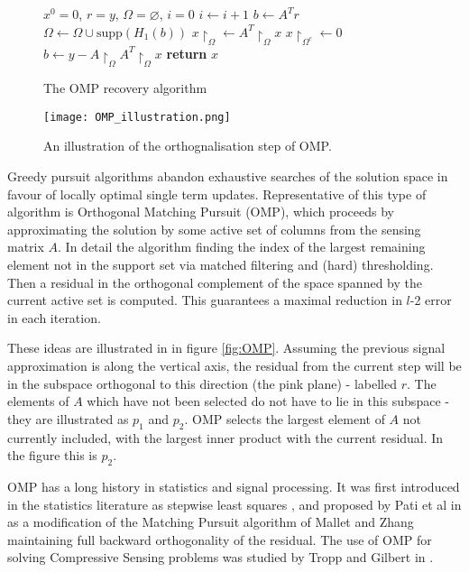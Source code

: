 \begin{figure}
\begin{algorithmic}[1]
\State $x^0 = 0$, $r=y$, $\Omega = \varnothing$, $i=0$
\State $i \gets i+1$
\State $b\gets A^Tr$
\State $\Omega \gets \Omega \cup \mathrm{supp}\left(H_1\left(b\right)\right)$
\State $x\restriction_{\Omega} \gets A^T\restriction_{\Omega}x$
\State $x\restriction_{\Omega^c} \gets 0$
\State $b \gets y - A\restriction_{\Omega} A^T\restriction_{\Omega}x$
\EndWhile
\State \textbf{return} $x$
\EndProcedure
\end{algorithmic}
\caption{The OMP recovery algorithm}\label{alg:omp}
\end{figure}


\begin{figure*}[h]
\centering
\texttt{[image: OMP\_illustration.png]}
\caption{An illustration of the orthognalisation step of OMP. \cite{blumensath2007difference}}
\label{fig:OMP}
\end{figure*}

Greedy pursuit algorithms abandon exhaustive searches of the solution space in favour of locally optimal single term updates. Representative of this type of algorithm is Orthogonal Matching Pursuit (OMP), which proceeds by approximating the solution by some active set of columns from the sensing matrix \(A\). In detail the algorithm finding the index of the largest remaining element not in the support set via matched filtering and (hard) thresholding. Then a residual in the orthogonal complement of the space spanned by the current active set is computed. This guarantees a maximal reduction in \(l\)-2 error in each iteration.

These ideas are illustrated in in figure \eqref{fig:OMP}. Assuming the previous signal approximation is along the vertical axis, the residual from the current step will be in the subspace orthogonal to this direction (the pink plane) - labelled \(r\). The elements of \(A\) which have not been selected do not have to lie in this subspace - they are illustrated as \(p_1\) and \(p_2\). OMP selects the largest element of \(A\) not currently included, with the largest inner product with the current residual. In the figure this is \(p_2\).

OMP has a long history in statistics and signal processing. It was first introduced in the statistics literature as stepwise least squares \cite{goldberger1961stepwise}, and proposed by Pati et al in \cite{pati1993orthogonal} as a modification of the Matching Pursuit algorithm of Mallet and Zhang \cite{mallat1993matching} maintaining full backward orthogonality of the residual. The use of OMP for solving Compressive Sensing problems was studied by Tropp and Gilbert in \cite{tropp2007signal}. 

